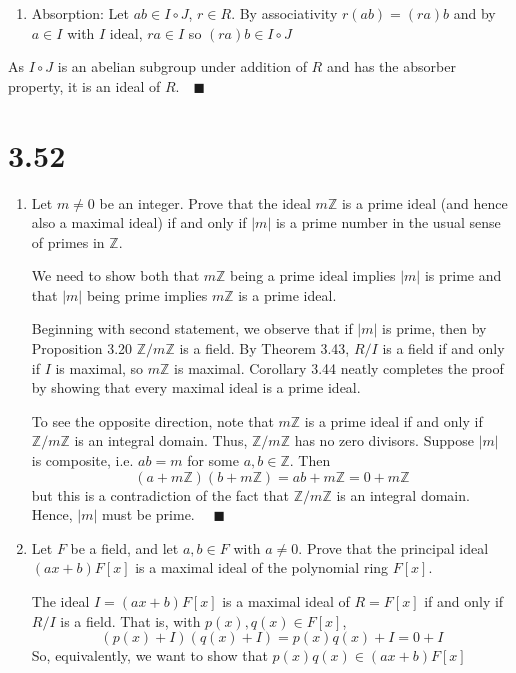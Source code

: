 \documentclass[12pt]{article}
\newcommand{\Z}{\mathbb{Z}}
\newcommand{\qed}{\quad \blacksquare}
\begin{document}
\begin{enumerate}[label=(\alph*)]
\begin{enumerate}
                    \item Absorption: Let $ab \in I\circ J $, $r \in R$. By associativity $r(ab) = (ra)b$ and by $a \in I$ with $I$ ideal, $ra \in I$ so $(ra)b \in I\circ J$
                \end{enumerate}
                As $I \circ J$ is an abelian subgroup under addition of $R$ and has the absorber property, it is an ideal of $R. \qed$
            \color{black}
    \end{enumerate}

\pagebreak

\section*{3.52}
    \begin{enumerate}[label=(\alph*)]
        \item Let $m \neq 0$ be an integer. Prove that the ideal $m\Z$ is a prime ideal (and hence also a maximal ideal) if and only if $|m|$ is a prime number in the usual sense of primes in $\Z$.
        
            \color{blue}
                We need to show both that $m\Z$ being a prime ideal implies $\big\vert m \big\vert$ is prime and that $\big\vert m \big\vert$ being prime implies $m\Z$ is a prime ideal. 

                Beginning with second statement, we observe that if $\big\vert m \big\vert$ is prime, then by Proposition 3.20 $\Z/m\Z$ is a field. By Theorem 3.43, $R/I$ is a field if and only if $I$ is maximal, so $m\Z$ is maximal. Corollary 3.44 neatly completes the proof by showing that every maximal ideal is a prime ideal. 

                To see the opposite direction, note that $m\Z$ is a prime ideal if and only if $\Z/m\Z$ is an integral domain. Thus, $\Z/m\Z$ has no zero divisors. Suppose $\big\vert m \big\vert$ is composite, i.e. $ab = m$ for some $a, b \in \Z$. Then
                \[(a + m\Z)(b + m\Z) = ab + m\Z = 0 + m\Z\]
                but this is a contradiction of the fact that $\Z/m\Z$ is an integral domain. Hence, $\big\vert m \big\vert$ must be prime. $\qed$
            \color{black}

        \item Let $F$ be a field, and let $a, b \in F$ with $a\neq 0$. Prove that the principal ideal $(ax + b)F[x]$ is a maximal ideal of the polynomial ring $F[x]$.

            \color{blue}
                The ideal $I = (ax + b)F[x]$ is a maximal ideal of $R = F[x]$ if and only if $R/I$ is a field. That is, with $p(x), q(x) \in F[x]$,
                \[(p(x) + I)(q(x) + I) = p(x)q(x) + I = 0 + I\]
                So, equivalently, we want to show that $p(x)q(x) \in (ax + b)F[x]$ 


\end{enumerate}
\end{document}
